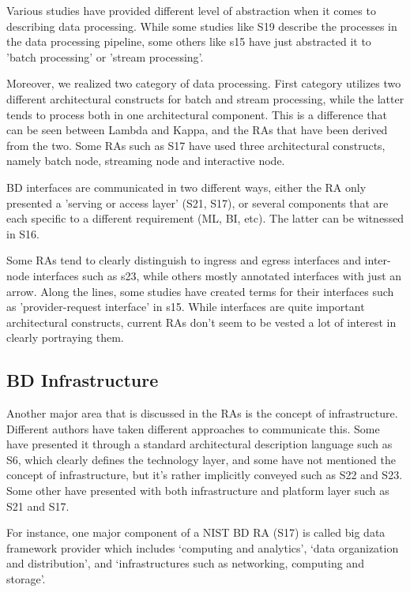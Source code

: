 \documentclass[review]{elsarticle}
\begin{document}
Various studies have provided different level of abstraction when it comes to describing data processing. While some studies like S19 describe the processes in the data processing pipeline, some others like s15 have just abstracted it to 'batch processing' or 'stream processing'. 

Moreover, we realized two category of data processing. First category utilizes two different architectural constructs for batch and stream processing, while the latter tends to process both in one architectural component. This is a difference that can be seen between Lambda and Kappa, and the RAs that have been derived from the two. Some RAs such as S17 have used three architectural constructs, namely batch node, streaming node and interactive node. 

BD interfaces are communicated in two different ways, either the RA only presented a 'serving or access layer' (S21, S17), or several components that are each specific to a different requirement (ML, BI, etc). The latter can be witnessed in S16.

Some RAs tend to clearly distinguish to ingress and egress interfaces and inter-node interfaces such as s23, while others mostly annotated interfaces with just an arrow. Along the lines, some studies have created terms for their interfaces such as 'provider-request interface' in s15. While interfaces are quite important architectural constructs, current RAs don't seem to be vested a lot of interest in clearly portraying them. 

\subsection{BD Infrastructure}

Another major area that is discussed in the RAs is the concept of infrastructure. Different authors have taken different approaches to communicate this. Some have presented it through a standard architectural description language such as S6, which clearly defines the technology layer, and some have not mentioned the concept of infrastructure, but it's rather implicitly conveyed such as S22 and S23. Some other have presented with both infrastructure and platform layer such as S21 and S17. 

For instance, one major component of a NIST BD RA (S17) is called big data framework provider which includes ‘computing and analytics’, ‘data organization and distribution’, and ‘infrastructures such as networking, computing and storage’.  
\end{document}
